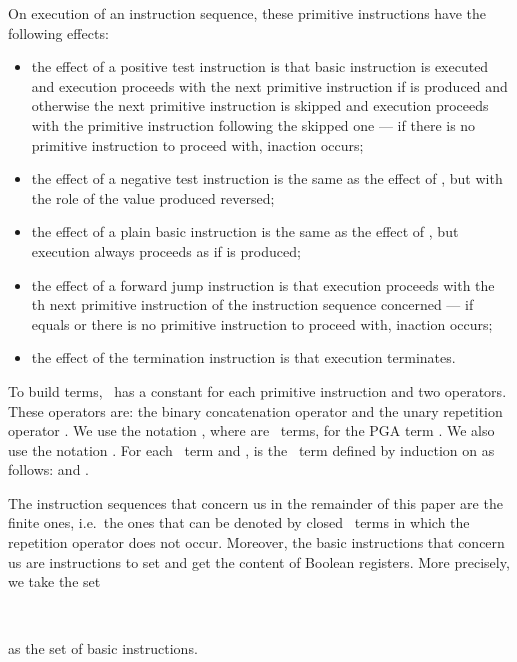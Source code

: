 \documentclass{llncs}
\begin{document}
On execution of an instruction sequence, these primitive instructions
have the following effects:
\begin{itemize}
\item
the effect of a positive test instruction  is that basic
instruction  is executed and execution proceeds with the next
primitive instruction if  is produced and otherwise the next
primitive instruction is skipped and execution proceeds with the
primitive instruction following the skipped one --- if there is no
primitive instruction to proceed with,
inaction occurs;
\item
the effect of a negative test instruction  is the same as
the effect of , but with the role of the value produced
reversed;
\item
the effect of a plain basic instruction  is the same as the effect
of , but execution always proceeds as if  is produced;
\item
the effect of a forward jump instruction  is that execution
proceeds with the th next primitive instruction of the instruction
sequence concerned --- if  equals  or there is no primitive
instruction to proceed with, inaction occurs;
\item
the effect of the termination instruction  is that execution
terminates.
\end{itemize}

To build terms, \PGA\ has a constant for each primitive instruction and 
two operators. 
These operators are: the binary concatenation operator  and 
the unary repetition operator .
We use the notation , where  are 
\PGA\ terms, for the PGA term .
We also use the notation . 
For each \PGA\ term  and ,  is the \PGA\ term defined by 
induction on  as follows:  and .

The instruction sequences that concern us in the remainder of this paper 
are the finite ones, i.e.\ the ones that can be denoted by closed \PGA\ 
terms in which the repetition operator does not occur. 
Moreover, the basic instructions that concern us are instructions to set 
and get the content of Boolean registers.
More precisely, we take the set
\begin{ldispl}
 \union
{}
\\ \;\; {} \union
{} \union
{} 
\end{ldispl}as the set  of basic instructions.
\end{document}
